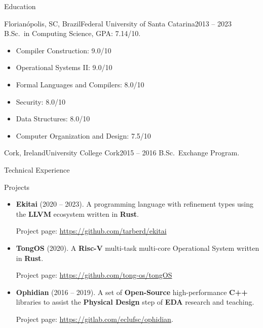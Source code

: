 \documentclass[calibri]{mcdowellcv}
\begin{document}
	\newpage
	\begin{cvsection}{Education}
		\begin{cvsubsection}{Florianópolis, SC, Brazil}{Federal University of Santa Catarina}{2013 -- 2023}
			B.Sc.\ in Computing Science, GPA\@: 7.14/10.
			\begin{multicols}{2}
				\begin{itemize}
						\item Compiler Construction: 9.0/10
						\item Operational Systems II\@: 9.0/10
						\item Formal Languages and Compilers: 8.0/10
						\item Security: 8.0/10
						\item Data Structures: 8.0/10
						\item Computer Organization and Design: 7.5/10
				\end{itemize}
		  \end{multicols}
  	\end{cvsubsection}
		\begin{cvsubsection}{Cork, Ireland}{University College Cork}{2015 -- 2016}
			B.Sc.\ Exchange Program.
  	\end{cvsubsection}
	\end{cvsection}

	\begin{cvsection}{Technical Experience}
		\begin{cvsubsection}{Projects}{}{}
			\begin{itemize}
				\item \textbf{Ekitai} (2020 -- 2023). A programming language with refinement types using the \textbf{LLVM} ecosystem written in \textbf{Rust}.

				Project page: \url{https://github.com/tarberd/ekitai}

				\item \textbf{TongOS} (2020). A \textbf{Risc-V} multi-task multi-core Operational System written in \textbf{Rust}.

				Project page: \url{https://github.com/tong-os/tongOS}

				\item \textbf{Ophidian} (2016 -- 2019). A set of \textbf{Open-Source} high-performance \textbf{C++} libraries to assist the \textbf{Physical Design} step of \textbf{EDA} research and teaching.

				Project page: \url{https://gitlab.com/eclufsc/ophidian}.
			\end{itemize}
		\end{cvsubsection}
	\end{cvsection}
\end{document}
